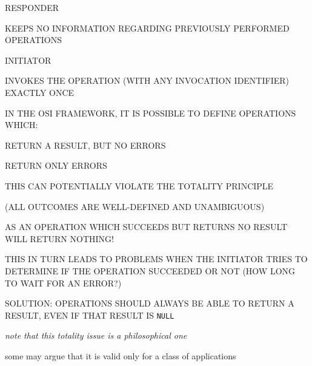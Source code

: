 \begin{bwslide}

\begin{nrtc}
\item	RESPONDER
    \begin{nrtc}
    \item	KEEPS NO INFORMATION REGARDING PREVIOUSLY PERFORMED OPERATIONS
    \end{nrtc}

\item	INITIATOR
    \begin{nrtc}
    \item	INVOKES THE OPERATION (WITH ANY INVOCATION IDENTIFIER)
		EXACTLY ONCE
    \end{nrtc}
\end{nrtc}
\end{bwslide}


\begin{bwslide}

\begin{nrtc}
\item	IN THE OSI FRAMEWORK, IT IS POSSIBLE TO DEFINE OPERATIONS WHICH:
    \begin{nrtc}
    \item 	RETURN A RESULT, BUT NO ERRORS

    \item	RETURN ONLY ERRORS
    \end{nrtc}

\item	THIS CAN POTENTIALLY VIOLATE THE TOTALITY PRINCIPLE
    \begin{nrtc}
    \item	(ALL OUTCOMES ARE WELL-DEFINED AND UNAMBIGUOUS)
    \end{nrtc}
    AS AN OPERATION WHICH SUCCEEDS BUT RETURNS NO RESULT WILL RETURN NOTHING!

\item	THIS IN TURN LEADS TO PROBLEMS WHEN THE INITIATOR TRIES TO DETERMINE
	IF THE OPERATION SUCCEEDED OR NOT (HOW LONG TO WAIT FOR AN ERROR?)

\item	SOLUTION: OPERATIONS SHOULD ALWAYS BE ABLE TO RETURN A RESULT,
	EVEN IF THAT RESULT IS \verb"NULL"
\end{nrtc}
\end{bwslide}


\begin{note}\em
note that this totality issue is a philosophical one

some may argue that it is valid only for a class of applications
\end{note}


